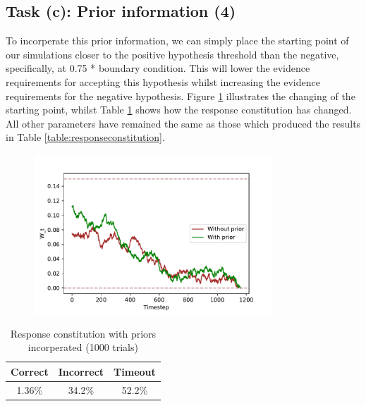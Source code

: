 \documentclass{article}
\begin{document}
\subsection{Task (c): Prior information (4)}

To incorperate this prior information, we can simply place the starting point of our simulations closer to the positive hypothesis threshold than the negative, specifically, at 0.75 * boundary condition. This will lower the evidence requirements for accepting this hypothesis whilst increasing the evidence requirements for the negative hypothesis. Figure \ref{fig:examplepathswithpriors} illustrates the changing of the starting point, whilst Table \ref{table:priorresponseconstitution} shows how the response constitution has changed. All other parameters have remained the same as those which produced the results in Table \ref{table:responseconstitution}.

\begin{figure}[H]
  \centering
  \includegraphics[width=0.8\textwidth]{figures/part1/task3/example_paths_with_priors.pdf}
  \label{fig:examplepathswithpriors}
\end{figure}

\begin{table}[h]
  \begin{tabular}{|l|l|l|}
  \hline
  \textbf{Correct}            & \textbf{Incorrect}          & \textbf{Timeout}            \\ \hline
  \multicolumn{1}{|c|}{1.36\%} & \multicolumn{1}{c|}{34.2\%} & \multicolumn{1}{c|}{52.2\%} \\ \hline
  \end{tabular}
  \centering
  \caption{Response constitution with priors incorperated (1000 trials)}
  \label{table:priorresponseconstitution}
\end{table}
\end{document}
